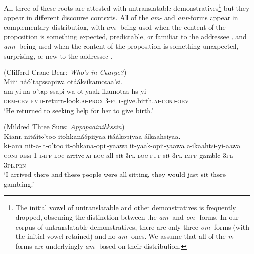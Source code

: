 \documentclass[output=paper,colorlinks,citecolor=brown]{langscibook}
\begin{document}
All three of these roots are attested with untranslatable demonstratives\footnote{The initial vowel of untranslatable and other demonstratives is frequently dropped, obscuring the distinction between the \textit{am}- and \textit{om}- forms. In our corpus of untranslatable demonstratives, there are only three \textit{om}- forms (with the initial vowel retained) and no \textit{am}- ones. We assume that all of the \textit{m}- forms are underlyingly \textit{am}- based on their distribution.} but they appear in different discourse contexts. All of the \textit{am}- and \textit{ann}-forms appear in complementary distribution, with \textit{am}- being used when the content of the proposition is something expected, predictable, or familiar to the addressee , and \textit{ann}- being used when the content of the proposition is something unexpected, surprising, or new to the addressee .

\ea\label{ex:bliss:12} (Clifford Crane Bear: \textit{Who’s in Charge?})\\
{Miiii náó’tapssapiwa otááksikamotaa’si.}\\
\gll am-yi na-o’tap-ssapi-wa ot-yaak-ikamotaa-hs-yi\\
     \textsc{dem-obv} \textsc{evid}-return-look.\textsc{ai-prox} \textsc{3-fut}-give.birth.\textsc{ai-conj-obv}\\
 ‘He returned to seeking help for her to give birth.’ 
\z

\ea\label{ex:bliss:13} (Mildred Three Suns: \textit{Appapaainihkssin})\\
{Kiann nitáíto’too itohkanáópiiyaa itáákopiyaa áíkaahsiyaa.}\\
\gll ki-ann nit-a-it-o’too it-ohkana-opii-yaawa it-yaak-opii-yaawa a-ikaahtsi-yi-aawa\\
     \textsc{conj-dem} \textsc{1-impf-loc}-arrive.\textsc{ai} \textsc{loc-}all-sit-\textsc{3pl} \textsc{loc-fut}-sit-\textsc{3pl} \textsc{impf}-gamble-\textsc{3pl-3pl.prn}\\
 ‘I arrived there and these people were all sitting, they would just sit there gambling.’ 
\z
\end{document}

